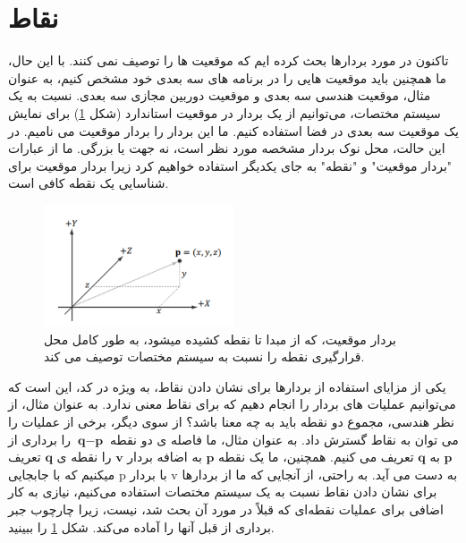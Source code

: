 \section{\textbf{نقاط}}
{
    \Large
    \begin{spacing}{1.5}
        تاکنون در مورد بردارها بحث کرده ایم که موقعیت ها را توصیف نمی کنند.
        با این حال، ما همچنین باید موقعیت هایی را در برنامه های سه بعدی خود مشخص کنیم،
        به عنوان مثال، موقعیت هندسی سه بعدی و موقعیت دوربین مجازی سه بعدی.
        نسبت به یک سیستم مختصات، می‌توانیم از یک بردار در موقعیت استاندارد (شکل \ref{fig:4.Session.1.1.16}) برای نمایش یک موقعیت سه بعدی در فضا استفاده کنیم.
        ما این بردار را بردار موقعیت می نامیم.
        در این حالت، محل نوک بردار مشخصه مورد نظر است، نه جهت یا بزرگی.
        ما از عبارات "بردار موقعیت" و "نقطه" به جای یکدیگر استفاده خواهیم کرد زیرا بردار موقعیت برای شناسایی یک نقطه کافی است.

        \begin{figure}[H]
            \centering
            \setlength{\belowcaptionskip}{-10pt}
            \includegraphics[width=0.5\textwidth]{Images/4/4.Session.1.1.16}
            \caption {بردار موقعیت، که از مبدا تا نقطه کشیده میشود، به طور کامل محل قرارگیری نقطه را نسبت به سیستم مختصات توصیف می کند.}
            \label{fig:4.Session.1.1.16}
        \end{figure}

        یکی از مزایای استفاده از بردارها برای نشان دادن نقاط، به ویژه در کد، این است که می‌توانیم عملیات های بردار را انجام دهیم که برای نقاط معنی ندارد.
        به عنوان مثال، از نظر هندسی، مجموع دو نقطه باید به چه معنا باشد؟
        از سوی دیگر، برخی از عملیات را می توان به نقاط گسترش داد.
        به عنوان مثال، ما فاصله ی دو نقطه $\textbf{q}-\textbf{p}$ را برداری از $\textbf{p}$ به $\textbf{q}$ تعریف می کنیم. همچنین، ما یک نقطه $\textbf{p}$ به اضافه بردار $\textbf{v}$ را نقطه ی $\textbf{q}$ تعریف میکنیم که با جابجایی p با بردار v به دست می آید.
        به راحتی، از آنجایی که ما از بردارها برای نشان دادن نقاط نسبت به یک سیستم مختصات استفاده می‌کنیم، نیازی به کار اضافی برای عملیات نقطه‌ای که قبلاً در مورد آن بحث شد، نیست، زیرا چارچوب جبر برداری از قبل آنها را آماده می‌کند. شکل \ref{fig:4.Session.1.1.16} را ببینید.


\end{spacing}}
